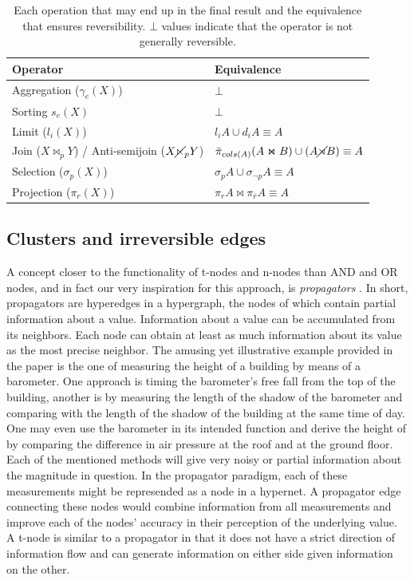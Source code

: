\begin{table}[H]
  \centering
  \caption{\label{tab:reverse_cprresp}Each operation that may end up in the final result and the equivalence that ensures reversibility. \(\bot\) values indicate that the operator is not generally reversible.}
  \begin{tabular}{ll}
    Operator & Equivalence\\
    \hline
    Aggregation (\(\gamma_e(X)\)) & \(\bot\) \\
    Sorting \(s_e(X)\) & \(\bot\) \\
    Limit (\(l_i(X)\)) & \(l_i A \cup d_i A \equiv A\) \\
    Join (\(X \Join_p Y\)) / Anti-semijoin (\(X \cancel\ltimes_p Y\)) & \( \bar{\pi}_{cols(A)}(A \Join B) \cup (A \cancel\rtimes B) \equiv A\)  \\
    Selection (\(\sigma_p(X)\)) & \(\sigma_p A \cup \sigma_{\neg p} A \equiv A\) \\
    Projection (\(\pi_r(X)\)) & \(\pi_r A \Join \pi_{\bar{r}} A \equiv A\) \\
  \end{tabular}
\end{table}

\subsection{Clusters and irreversible edges}

A concept closer to the functionality of t-nodes and n-nodes than AND
and OR nodes, and in fact our very inspiration for this approach, is
\emph{propagators} \cite{radulPropagationNetworksFlexible2009a}. In
short, propagators are hyperedges in a hypergraph, the nodes of which
contain partial information about a value. Information about a value
can be accumulated from its neighbors. Each node can obtain at least
as much information about its value as the most precise neighbor. The
amusing yet illustrative example provided in the paper is the one of
measuring the height of a building by means of a barometer. One
approach is timing the barometer's free fall from the top of the
building, another is by measuring the length of the shadow of the
barometer and comparing with the length of the shadow of the building
at the same time of day. One may even use the barometer in its
intended function and derive the height of by comparing the difference
in air pressure at the roof and at the ground floor. Each of the
mentioned methods will give very noisy or partial information about
the magnitude in question. In the propagator paradigm, each of these
measurements might be represended as a node in a hypernet. A
propagator edge connecting these nodes would combine information from
all measurements and improve each of the nodes' accuracy in their
perception of the underlying value. A t-node is similar to a
propagator in that it does not have a strict direction of information
flow and can generate information on either side given information on
the other.

